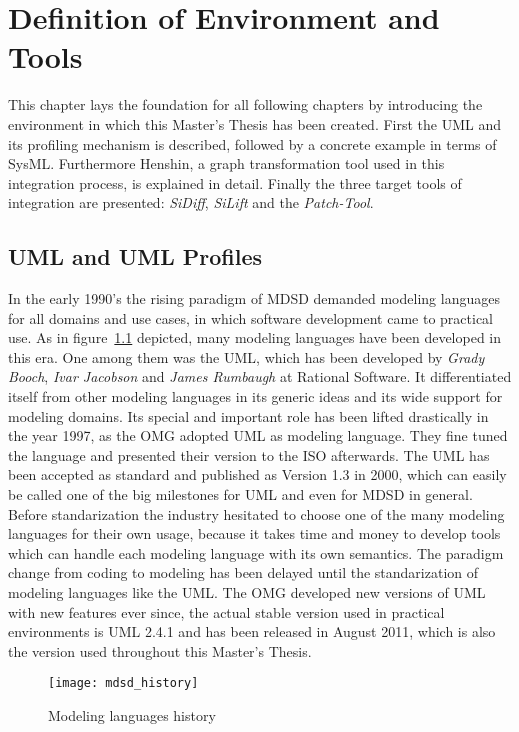 \chapter{Definition of Environment and Tools}\label{environment_and_tools}
This chapter lays the foundation for all following chapters by introducing the
environment in which this Master's Thesis has been created. First the \ac{UML}
and its profiling mechanism is described, followed by a concrete
example in terms of \ac{SysML}.
Furthermore Henshin, a graph transformation tool used in this integration process, is
explained in detail. Finally the three target tools of integration are
presented:
\textit{SiDiff}, \textit{SiLift} and the \textit{Patch-Tool}.
\section{UML and UML Profiles}\label{environment_and_tools:umlprofiles}
In the early 1990's the rising paradigm of \ac{MDSD} demanded modeling languages
for all domains and use cases, in which software development came to practical
use. As in figure~\ref{mdsd_history} depicted, many modeling languages have been
developed in this era. One among them was the \ac{UML}, which has been developed
by \textit{Grady Booch}, \textit{Ivar Jacobson} and \textit{James Rumbaugh} at
Rational Software\cite{Wik13_1}. It differentiated itself from other modeling
languages in its generic ideas and its wide support for modeling domains. Its
special and important role has been lifted drastically in the year 1997, as the
\ac{OMG} adopted \ac{UML} as modeling language. They fine tuned
the language and presented their version to the \ac{ISO} afterwards. The
\ac{UML} has been accepted as standard and published as Version 1.3 in 2000,
which can easily be called one of the big milestones for \ac{UML} and even for
\ac{MDSD} in general. Before standarization the industry hesitated to choose one
of the many modeling languages for their own usage, because it takes time and
money to develop tools which can handle each modeling language with its own
semantics. The paradigm change from coding to modeling has been delayed until
the standarization of modeling languages like the \ac{UML}. The \ac{OMG}
developed new versions of \ac{UML} with new features ever since, the actual
stable version used in practical environments is \ac{UML} 2.4.1 and has been
released in August 2011\cite{OMGUMLSpecification}, which is also the version
used throughout this Master's Thesis. 
\begin{figure}[h!]
\begin{center}
\texttt{[image: mdsd\_history]}\\
\end{center}
\caption{Modeling languages history~\cite{Wik13_1}}
\label{mdsd_history}
\end{figure}

